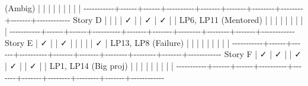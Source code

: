 \documentclass[11pt]{article}
\newenvironment{Shaded}{\begin{snugshade}}{\end{snugshade}}
\newcommand{\NormalTok}[1]{\textcolor[rgb]{0.81,0.81,0.76}{#1}}
\newcommand{\OperatorTok}[1]{\textcolor[rgb]{0.81,0.81,0.76}{#1}}
\begin{document}
\begin{Shaded}
\begin{Highlighting}[]
\NormalTok{(Ambig)    }\OperatorTok{|}      \OperatorTok{|}      \OperatorTok{|}          \OperatorTok{|}       \OperatorTok{|}       \OperatorTok{|}        \OperatorTok{|}        \OperatorTok{|}       \OperatorTok{|}
\OperatorTok{{-}{-}{-}{-}{-}{-}{-}{-}{-}{-}{-}+{-}{-}{-}{-}{-}{-}+{-}{-}{-}{-}{-}{-}+{-}{-}{-}{-}{-}{-}{-}{-}{-}{-}+{-}{-}{-}{-}{-}{-}{-}+{-}{-}{-}{-}{-}{-}{-}+{-}{-}{-}{-}{-}{-}{-}{-}+{-}{-}{-}{-}{-}{-}{-}{-}+{-}{-}{-}{-}{-}{-}{-}+{-}{-}{-}{-}{-}{-}{-}{-}{-}{-}{-}{-}}
\NormalTok{Story D    }\OperatorTok{|}      \OperatorTok{|}      \OperatorTok{|}          \OperatorTok{|}\NormalTok{  ✓    }\OperatorTok{|}       \OperatorTok{|}\NormalTok{  ✓     }\OperatorTok{|}\NormalTok{  ✓     }\OperatorTok{|}       \OperatorTok{|}\NormalTok{ LP6, LP11}
\NormalTok{(Mentored) }\OperatorTok{|}      \OperatorTok{|}      \OperatorTok{|}          \OperatorTok{|}       \OperatorTok{|}       \OperatorTok{|}        \OperatorTok{|}        \OperatorTok{|}       \OperatorTok{|}
\OperatorTok{{-}{-}{-}{-}{-}{-}{-}{-}{-}{-}{-}+{-}{-}{-}{-}{-}{-}+{-}{-}{-}{-}{-}{-}+{-}{-}{-}{-}{-}{-}{-}{-}{-}{-}+{-}{-}{-}{-}{-}{-}{-}+{-}{-}{-}{-}{-}{-}{-}+{-}{-}{-}{-}{-}{-}{-}{-}+{-}{-}{-}{-}{-}{-}{-}{-}+{-}{-}{-}{-}{-}{-}{-}+{-}{-}{-}{-}{-}{-}{-}{-}{-}{-}{-}{-}}
\NormalTok{Story E    }\OperatorTok{|}\NormalTok{  ✓   }\OperatorTok{|}      \OperatorTok{|}\NormalTok{  ✓       }\OperatorTok{|}       \OperatorTok{|}       \OperatorTok{|}        \OperatorTok{|}        \OperatorTok{|}\NormalTok{  ✓    }\OperatorTok{|}\NormalTok{ LP13, LP8}
\NormalTok{(Failure)  }\OperatorTok{|}      \OperatorTok{|}      \OperatorTok{|}          \OperatorTok{|}       \OperatorTok{|}       \OperatorTok{|}        \OperatorTok{|}        \OperatorTok{|}       \OperatorTok{|}
\OperatorTok{{-}{-}{-}{-}{-}{-}{-}{-}{-}{-}{-}+{-}{-}{-}{-}{-}{-}+{-}{-}{-}{-}{-}{-}+{-}{-}{-}{-}{-}{-}{-}{-}{-}{-}+{-}{-}{-}{-}{-}{-}{-}+{-}{-}{-}{-}{-}{-}{-}+{-}{-}{-}{-}{-}{-}{-}{-}+{-}{-}{-}{-}{-}{-}{-}{-}+{-}{-}{-}{-}{-}{-}{-}+{-}{-}{-}{-}{-}{-}{-}{-}{-}{-}{-}{-}}
\NormalTok{Story F    }\OperatorTok{|}\NormalTok{  ✓   }\OperatorTok{|}\NormalTok{  ✓   }\OperatorTok{|}          \OperatorTok{|}\NormalTok{  ✓    }\OperatorTok{|}\NormalTok{  ✓    }\OperatorTok{|}        \OperatorTok{|}\NormalTok{  ✓     }\OperatorTok{|}       \OperatorTok{|}\NormalTok{ LP1, LP14}
\NormalTok{(Big proj) }\OperatorTok{|}      \OperatorTok{|}      \OperatorTok{|}          \OperatorTok{|}       \OperatorTok{|}       \OperatorTok{|}        \OperatorTok{|}        \OperatorTok{|}       \OperatorTok{|}
\OperatorTok{{-}{-}{-}{-}{-}{-}{-}{-}{-}{-}{-}+{-}{-}{-}{-}{-}{-}+{-}{-}{-}{-}{-}{-}+{-}{-}{-}{-}{-}{-}{-}{-}{-}{-}+{-}{-}{-}{-}{-}{-}{-}+{-}{-}{-}{-}{-}{-}{-}+{-}{-}{-}{-}{-}{-}{-}{-}+{-}{-}{-}{-}{-}{-}{-}{-}+{-}{-}{-}{-}{-}{-}{-}+{-}{-}{-}{-}{-}{-}{-}{-}{-}{-}{-}{-}}

\end{Highlighting}
\end{Shaded}
\end{document}
